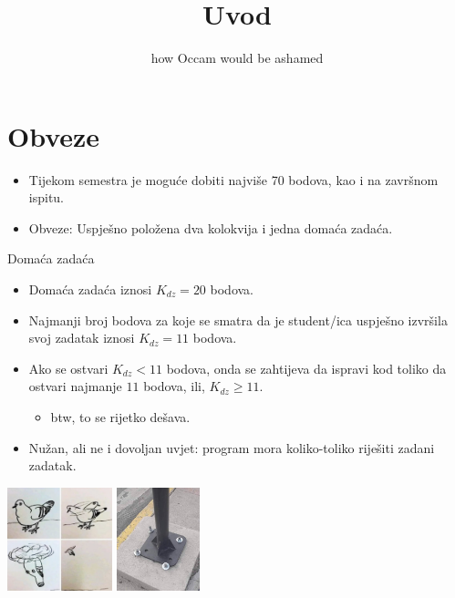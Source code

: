 \documentclass[9pt]{beamer}
\title{Uvod}
\subtitle{how Occam would be ashamed}
\institute{Računalna grafika}
\begin{document}
\begin{frame}
 \titlepage
\end{frame}

\section{Obveze}
\begin{frame}
	\begin{itemize}
		\item Tijekom semestra je moguće dobiti najviše 70 bodova, kao i na završnom ispitu.
		\item Obveze: Uspješno položena dva kolokvija i jedna domaća zadaća.
	\end{itemize}
\end{frame}
\begin{frame}{Domaća zadaća}
	\begin{itemize}
		\item Domaća zadaća iznosi $K_{dz} = 20$ bodova. 
		\item Najmanji broj bodova za koje se smatra da je student/ica uspješno izvršila svoj zadatak iznosi $K_{dz} = 11$ bodova. 
		\item Ako se ostvari $K_{dz}<11$ bodova, onda se zahtijeva da ispravi kod toliko da ostvari najmanje $11$ bodova, ili, $K_{dz}\ge 11 $. 
		\begin{itemize}
			\item btw, to se rijetko dešava.
		\end{itemize}
		\item Nužan, ali ne i dovoljan uvjet: program mora koliko-toliko riješiti zadani zadatak.
	\end{itemize}
\begin{center}
	\includegraphics[height=3cm]{./slike/programming_meme_bird.png}
	\includegraphics[height=3cm]{./slike/pole_screws.jpg}
\end{center}
\end{frame}
\end{document}
